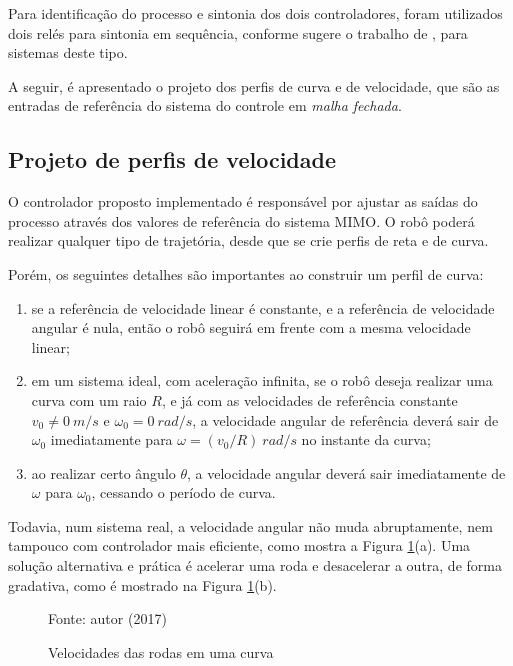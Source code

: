 Para identificação do processo e sintonia dos dois controladores, foram utilizados dois relés para sintonia em sequência, conforme sugere o trabalho de , para sistemas deste tipo.

A seguir, é apresentado o projeto dos perfis de curva e de velocidade, que são as entradas de referência do sistema do controle em \emph{malha fechada}. 

\subsection{Projeto de perfis de velocidade}
	O controlador proposto implementado é responsável por ajustar as saídas do processo através dos valores de referência do sistema MIMO. O robô poderá realizar qualquer tipo de trajetória, desde que se crie perfis de reta e de curva.
	
	Porém, os seguintes detalhes são importantes ao construir um perfil de curva:
	
	\begin{enumerate}[leftmargin=2cm,label=\alph*)]
	\item se a referência de velocidade linear é constante, e a referência de velocidade angular é nula, então o robô seguirá em frente com a mesma velocidade linear;
	\item em um sistema ideal, com aceleração infinita, se o robô deseja realizar uma curva com um raio $R$, e já com as velocidades de referência constante $v_0 \neq 0~m/s$ e $\omega_0 = 0 ~rad/s$, a velocidade angular de referência deverá sair de $\omega_0$ imediatamente para $\omega = (v_0/R)~rad/s$ no instante da curva;
	\item ao realizar certo ângulo $\theta$, a velocidade angular deverá sair imediatamente de $\omega$ para $\omega_0$, cessando o período de curva.
	\end{enumerate}
	
	Todavia, num sistema real, a velocidade angular não muda abruptamente, nem tampouco com controlador mais eficiente, como mostra a Figura \ref{fig:vel_rodas}(a). Uma solução alternativa e prática é acelerar uma roda e desacelerar a outra, de forma gradativa, como é mostrado na Figura \ref{fig:vel_rodas}(b).
	
\begin{figure}[!htb]
	\caption[Velocidades das rodas em uma curva]{\label{fig:vel_rodas}Velocidades das rodas em uma curva}
	\begin{center}
		\hspace*{0.1\linewidth}
	\end{center}
	\centering
	\small Fonte: autor (2017)
\end{figure}
	
